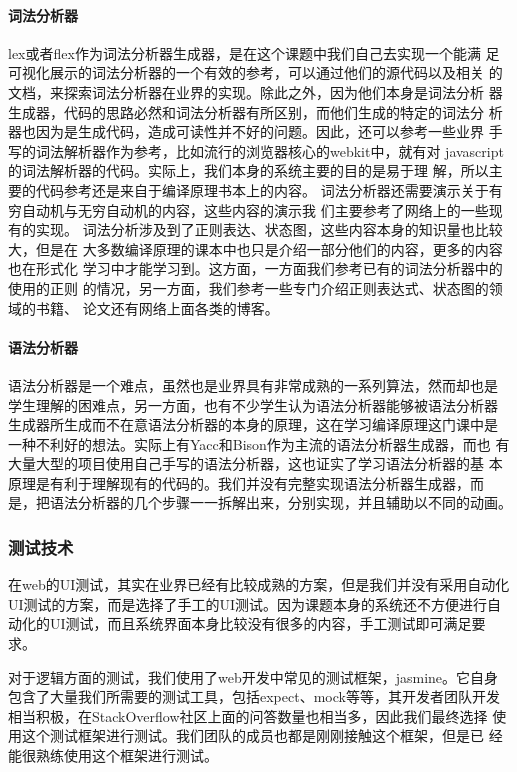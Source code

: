 \paragraph{词法分析器} 
lex或者flex作为词法分析器生成器，是在这个课题中我们自己去实现一个能满
足可视化展示的词法分析器的一个有效的参考，可以通过他们的源代码以及相关
的文档，来探索词法分析器在业界的实现。除此之外，因为他们本身是词法分析
器生成器，代码的思路必然和词法分析器有所区别，而他们生成的特定的词法分
析器也因为是生成代码，造成可读性并不好的问题。因此，还可以参考一些业界
手写的词法解析器作为参考，比如流行的浏览器核心的webkit中，就有对
javascript的词法解析器的代码。实际上，我们本身的系统主要的目的是易于理
解，所以主要的代码参考还是来自于编译原理书本上的内容。
词法分析器还需要演示关于有穷自动机与无穷自动机的内容，这些内容的演示我
们主要参考了网络上的一些现有的实现。
词法分析涉及到了正则表达、状态图，这些内容本身的知识量也比较大，但是在
大多数编译原理的课本中也只是介绍一部分他们的内容，更多的内容也在形式化
学习中才能学习到。这方面，一方面我们参考已有的词法分析器中的使用的正则
的情况，另一方面，我们参考一些专门介绍正则表达式、状态图的领域的书籍、
论文还有网络上面各类的博客。
\paragraph{语法分析器}
语法分析器是一个难点，虽然也是业界具有非常成熟的一系列算法，然而却也是
学生理解的困难点，另一方面，也有不少学生认为语法分析器能够被语法分析器
生成器所生成而不在意语法分析器的本身的原理，这在学习编译原理这门课中是
一种不利好的想法。实际上有Yacc和Bison作为主流的语法分析器生成器，而也
有大量大型的项目使用自己手写的语法分析器，这也证实了学习语法分析器的基
本原理是有利于理解现有的代码的。我们并没有完整实现语法分析器生成器，而
是，把语法分析器的几个步骤一一拆解出来，分别实现，并且辅助以不同的动画。
\subsubsection{测试技术}
在web的UI测试，其实在业界已经有比较成熟的方案，但是我们并没有采用自动化
UI测试的方案，而是选择了手工的UI测试。因为课题本身的系统还不方便进行自
动化的UI测试，而且系统界面本身比较没有很多的内容，手工测试即可满足要求。

对于逻辑方面的测试，我们使用了web开发中常见的测试框架，jasmine。它自身
包含了大量我们所需要的测试工具，包括expect、mock等等，其开发者团队开发
相当积极，在StackOverflow社区上面的问答数量也相当多，因此我们最终选择
使用这个测试框架进行测试。我们团队的成员也都是刚刚接触这个框架，但是已
经能很熟练使用这个框架进行测试。